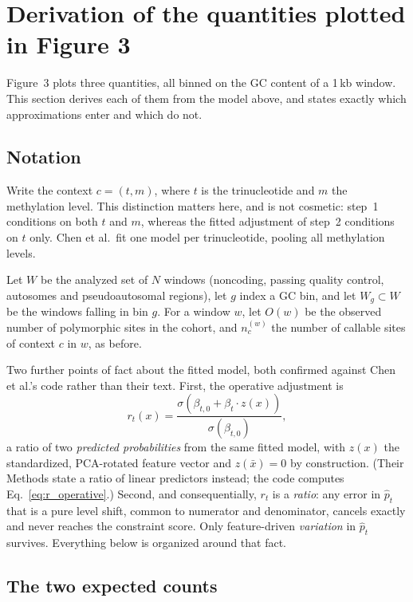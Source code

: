 \documentclass{article}
\begin{document}
\section{Derivation of the quantities plotted in Figure 3}
\label{sec:fig3}

Figure~3 plots three quantities, all binned on the GC content of a 1\,kb window.
This section derives each of them from the model above, and states exactly which
approximations enter and which do not.

\subsection{Notation}

Write the context $c = (t, m)$, where $t$ is the trinucleotide and $m$ the
methylation level. This distinction matters here, and is not cosmetic: step~1
conditions on both $t$ and $m$, whereas the fitted adjustment of step~2 conditions
on $t$ only. Chen et al.\ fit one model per trinucleotide, pooling all methylation
levels.

Let $W$ be the analyzed set of $N$ windows (noncoding, passing quality control,
autosomes and pseudoautosomal regions), let $g$ index a GC bin, and let
$W_g \subset W$ be the windows falling in bin $g$. For a window $w$, let $O(w)$ be
the observed number of polymorphic sites in the cohort, and $n_c^{(w)}$ the number
of callable sites of context $c$ in $w$, as before.

Two further points of fact about the fitted model, both confirmed against Chen et
al.'s code rather than their text. First, the operative adjustment is
\begin{equation}
    r_t(x) = \frac{\sigma\!\left(\beta_{t,0} + \beta_t \cdot z(x)\right)}
                  {\sigma\!\left(\beta_{t,0}\right)},
    \label{eq:r_operative}
\end{equation}
a ratio of two \emph{predicted probabilities} from the same fitted model, with
$z(x)$ the standardized, PCA-rotated feature vector and $z(\bar{x}) = 0$ by
construction. (Their Methods state a ratio of linear predictors instead; the code
computes Eq.~\eqref{eq:r_operative}.) Second, and consequentially, $r_t$ is a
\emph{ratio}: any error in $\hat{p}_t$ that is a pure level shift, common to
numerator and denominator, cancels exactly and never reaches the constraint score.
Only feature-driven \emph{variation} in $\hat{p}_t$ survives. Everything below is
organized around that fact.

\subsection{The two expected counts}
\end{document}
